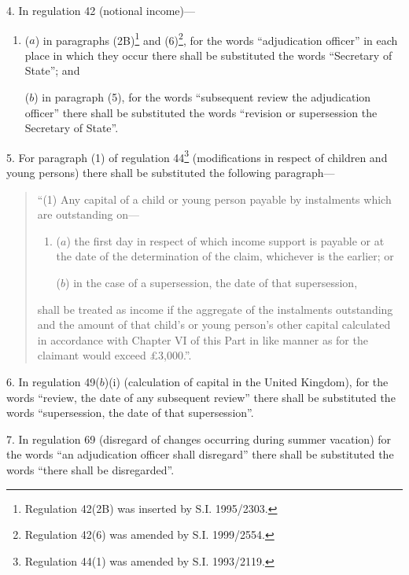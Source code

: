 \documentclass[12pt,a4paper]{article}
\begin{document}
\medskip

4.  In regulation 42 (notional income)---
\begin{enumerate}\item[]
($a$) in paragraphs (2B)\footnote{\frenchspacing Regulation 42(2B) was inserted by S.I. 1995/2303.} and (6)\footnote{\frenchspacing Regulation 42(6) was amended by S.I. 1999/2554.}, for the words “adjudication officer” in each place in which they occur there shall be substituted the words “Secretary of State”; and

($b$) in paragraph (5), for the words “subsequent review the adjudication officer” there shall be substituted the words “revision or supersession the Secretary of State”.
\end{enumerate}

\medskip

5.  For paragraph (1) of regulation 44\footnote{\frenchspacing Regulation 44(1) was amended by S.I. 1993/2119.} (modifications in respect of children and young persons) there shall be substituted the following paragraph---
\begin{quotation}
“(1) Any capital of a child or young person payable by instalments which are outstanding on---
\begin{enumerate}\item[]
($a$) the first day in respect of which income support is payable or at the date of the determination of the claim, whichever is the earlier; or

($b$) in the case of a supersession, the date of that supersession,
\end{enumerate}
shall be treated as income if the aggregate of the instalments outstanding and the amount of that child’s or young person’s other capital calculated in accordance with Chapter VI of this Part in like manner as for the claimant would exceed £3,000.”.
\end{quotation}

\medskip

6.  In regulation 49($b$)(i)  (calculation of capital in the United Kingdom), for the words “review, the date of any subsequent review” there shall be substituted the words “supersession, the date of that supersession”.

\medskip

7.  In regulation 69 (disregard of changes occurring during summer vacation) for the words “an adjudication officer shall disregard” there shall be substituted the words “there shall be disregarded”.
\end{document}
